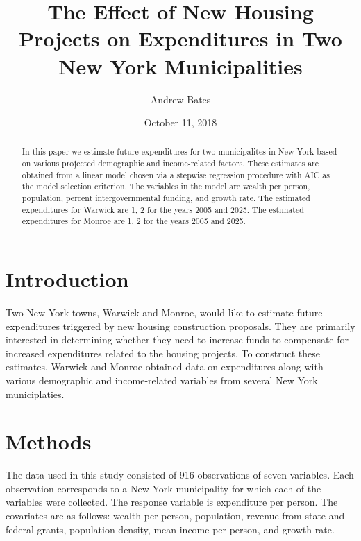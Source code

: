 \documentclass{article}\usepackage[]{graphicx}\usepackage[]{color}
\title{The Effect of New Housing Projects on Expenditures in Two New York Municipalities}
\author{Andrew Bates}
\date{October 11, 2018}
\begin{document}
 
\maketitle

\begin{abstract}
In this paper we estimate future expenditures for two municipalites in New York based on various projected demographic and income-related factors. These estimates are obtained from a linear model chosen via a stepwise regression procedure with AIC as the model selection criterion. The variables in the model are wealth per person, population, percent intergovernmental funding, and growth rate. The estimated expenditures for Warwick are 1, 2 for the years 2005 and 2025. The estimated expenditures for Monroe are 1, 2 for the years 2005 and 2025.
\end{abstract}


\section{Introduction} \label{intro}

Two New York towns, Warwick and Monroe, would like to estimate future expenditures triggered by new housing construction proposals. They are primarily interested in determining whether they need to increase funds to compensate for increased expenditures related to the housing projects. To construct these estimates, Warwick and Monroe obtained data on expenditures along with various demographic and income-related variables from several New York municiplaties. 

\section{Methods} \label{methods}

The data used in this study consisted of 916 observations of seven variables. Each observation corresponds to a New York municipality for which each of the variables were collected. The response variable is expenditure per person. The covariates are as follows: wealth per person, population, revenue from state and federal grants, population density, mean income per person, and growth rate.
\end{document}
